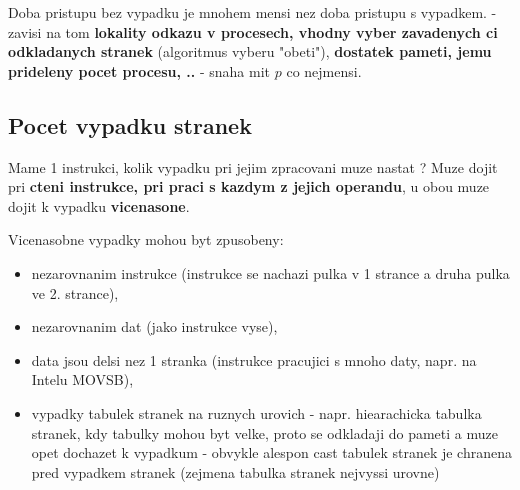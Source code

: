 \documentclass[a4paper, 11pt]{article}
\begin{document}
Doba pristupu bez vypadku je mnohem mensi nez doba pristupu s vypadkem. - zavisi na tom \textbf{lokality odkazu v procesech, vhodny vyber zavadenych ci odkladanych stranek} (algoritmus vyberu "obeti"), \textbf{dostatek pameti, jemu prideleny pocet procesu, ..} - snaha mit $p$ co nejmensi.

\newpage

\subsection{Pocet vypadku stranek}
Mame 1 instrukci, kolik vypadku pri jejim zpracovani muze nastat ? Muze dojit pri \textbf{cteni instrukce, pri praci s kazdym z jejich operandu}, u obou muze dojit k vypadku \textbf{vicenasone}.

Vicenasobne vypadky mohou byt zpusobeny:
\begin{itemize}
    \item nezarovnanim instrukce (instrukce se nachazi pulka v 1 strance a druha pulka ve 2. strance),
    \item nezarovnanim dat (jako instrukce vyse),
    \item data jsou delsi nez 1 stranka (instrukce pracujici s mnoho daty, napr. na Intelu MOVSB),
    \item vypadky tabulek stranek na ruznych urovich - napr. hiearachicka tabulka stranek, kdy tabulky mohou byt velke, proto se odkladaji do pameti a muze opet dochazet k vypadkum - obvykle alespon cast tabulek stranek je chranena pred vypadkem stranek (zejmena tabulka stranek nejvyssi urovne) \\
\end{itemize}
\end{document}
